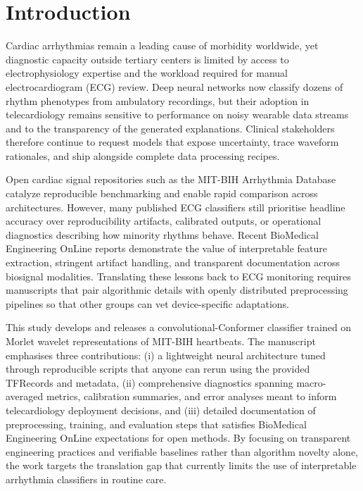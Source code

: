 \section{Introduction}
Cardiac arrhythmias remain a leading cause of morbidity worldwide, yet diagnostic capacity outside tertiary centers is limited by access to electrophysiology expertise and the workload required for manual electrocardiogram (ECG) review. Deep neural networks now classify dozens of rhythm phenotypes from ambulatory recordings, but their adoption in telecardiology remains sensitive to performance on noisy wearable data streams and to the transparency of the generated explanations.\cite{Hannun2019Cardiologist,Gadaleta2023SingleLead,Kim2024FortyFive,Ozpolat2023Quantum} Clinical stakeholders therefore continue to request models that expose uncertainty, trace waveform rationales, and ship alongside complete data processing recipes.

Open cardiac signal repositories such as the MIT-BIH Arrhythmia Database catalyze reproducible benchmarking and enable rapid comparison across architectures.\cite{Goldberger2000PhysioBank,Gliner2025Interpretability,Czerwinski2025Interpretable} However, many published ECG classifiers still prioritise headline accuracy over reproducibility artifacts, calibrated outputs, or operational diagnostics describing how minority rhythms behave. Recent BioMedical Engineering OnLine reports demonstrate the value of interpretable feature extraction, stringent artifact handling, and transparent documentation across biosignal modalities.\cite{Yoon2023Interpretable,Jiang2025Hybrid,Voss2023Multimodal,Stern2024InBed} Translating these lessons back to ECG monitoring requires manuscripts that pair algorithmic details with openly distributed preprocessing pipelines so that other groups can vet device-specific adaptations.

This study develops and releases a convolutional-Conformer classifier trained on Morlet wavelet representations of MIT-BIH heartbeats. The manuscript emphasises three contributions: (i) a lightweight neural architecture tuned through reproducible scripts that anyone can rerun using the provided TFRecords and metadata, (ii) comprehensive diagnostics spanning macro-averaged metrics, calibration summaries, and error analyses meant to inform telecardiology deployment decisions, and (iii) detailed documentation of preprocessing, training, and evaluation steps that satisfies BioMedical Engineering OnLine expectations for open methods. By focusing on transparent engineering practices and verifiable baselines rather than algorithm novelty alone, the work targets the translation gap that currently limits the use of interpretable arrhythmia classifiers in routine care.
